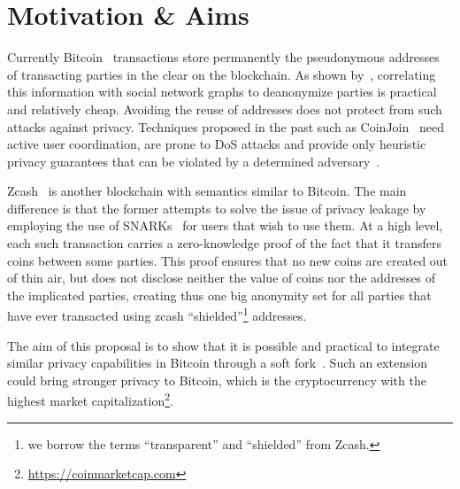 \section{Motivation \& Aims}
  Currently Bitcoin~\cite{TODO:bitcoin} transactions store permanently the
  pseudonymous addresses of transacting parties in the clear on the blockchain.
  As shown by~\cite{TODO:chainalysis}, correlating this information with social
  network graphs to deanonymize parties is practical and relatively cheap.
  Avoiding the reuse of addresses does not protect from such attacks against
  privacy.  Techniques proposed in the past such as
  CoinJoin~\cite{TODO:coinjoin} need active user coordination, are prone to DoS
  attacks and provide only heuristic privacy guarantees that can be violated by
  a determined adversary~\cite{TODO:anticoinjoin}.

  Zcash~\cite{TODO:zcash} is another blockchain with semantics similar to
  Bitcoin. The main difference is that the former attempts to solve the issue of
  privacy leakage by employing the use of SNARKs~\cite{TODO:snarks} for users
  that wish to use them. At a high level, each such transaction carries a
  zero-knowledge proof of the fact that it transfers coins between some parties.
  This proof ensures that no new coins are created out of thin air, but does not
  disclose neither the value of coins nor the addresses of the implicated
  parties, creating thus one big anonymity set for all parties that have ever
  transacted using zcash ``shielded''\footnote{we borrow the terms
  ``transparent'' and ``shielded'' from Zcash.} addresses.

  The aim of this proposal is to show that it is possible and practical to
  integrate similar privacy capabilities in Bitcoin through a soft
  fork~\cite{TODO:softfork}. Such an extension could bring stronger privacy to
  Bitcoin, which is the cryptocurrency with the highest market
  capitalization\footnote{\url{https://coinmarketcap.com}}.
